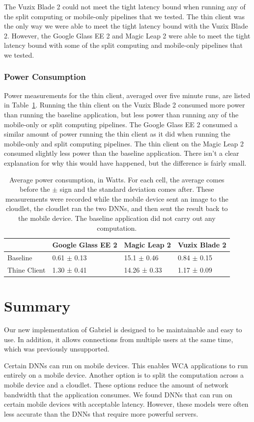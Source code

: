 The Vuzix Blade 2 could not meet the tight latency bound when running any of the
split computing or mobile-only pipelines that we tested.
The thin client was the only way we were able to meet the tight latency bound
with the Vuzix Blade 2.
However, the Google Glass EE 2 and Magic Leap 2 were able to meet the tight
latency bound with some of the split computing and mobile-only pipelines that we
tested.

\subsubsection{Power Consumption}

Power measurements for the thin client, averaged over five minute runs, are
listed in Table~\ref{tab:thin_power}.
Running the thin client on the Vuzix Blade 2 consumed more power than running
the baseline application, but less power than running any of the mobile-only or
split computing pipelines.
The Google Glass EE 2 consumed a similar amount of power running the thin client
as it did when running the mobile-only and split computing pipelines.
The thin client on the Magic Leap 2 consumed slightly less power than the
baseline application.
There isn't a clear explanation for why this would have happened, but the
difference is fairly small.

\begin{table}
\begin{tabular}{|l||l|l|l|}
  \hline
  & Google Glass EE 2 & Magic Leap 2 & Vuzix Blade 2\\
  \hline
  \hline
  Baseline & 0.61 $\pm$ 0.13 & 15.1 $\pm$ 0.46 & 0.84 $\pm$ 0.15\\
  Thine Client & 1.30 ± 0.41 & 14.26 ± 0.33 & 1.17 ± 0.09\\
  \hline
\end{tabular}
  \caption{
    Average power consumption, in Watts.
    For each cell, the average comes before the $\pm$ sign and the standard
    deviation comes after.
    These measurements were recorded while the mobile device sent an image to
    the cloudlet, the cloudlet ran the two DNNs, and then sent the result back
    to the mobile device.
    The baseline application did not carry out any computation.
  }\label{tab:thin_power}
\end{table}

\section{Summary}

Our new implementation of Gabriel is designed to be maintainable and easy to
use.
In addition, it allows connections from multiple users at the same time, which
was previously unsupported.

Certain DNNs can run on mobile devices.
This enables WCA applications to run entirely on a mobile device.
Another option is to split the computation across a mobile device and a
cloudlet.
These options reduce the amount of network bandwidth that the application
consumes.
We found DNNs that can run on certain mobile devices with acceptable latency.
However, these models were often less accurate than the DNNs that require more
powerful servers.
